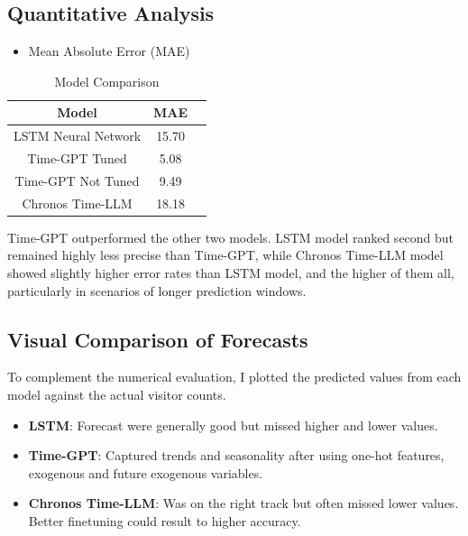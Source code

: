 \documentclass{article}
\begin{document}
\subsection{Quantitative Analysis}
\begin{itemize}
    \item Mean Absolute Error (MAE)
\end{itemize}

\begin{table}[h]
\centering
\begin{tabular}{|c|c|c|}
\hline  
\textbf{Model} & \textbf{MAE} \\
\hline
LSTM Neural Network  & 15.70 \\
\hline
Time-GPT Tuned  & 5.08 \\
\hline
Time-GPT Not Tuned &  9.49 \\
\hline
Chronos Time-LLM  & 18.18 \\
\hline

\end{tabular}
\caption{Model Comparison}
\label{tab:example}
\end{table}

Time-GPT outperformed the other two models. LSTM model ranked second but remained highly less precise than Time-GPT, while Chronos Time-LLM model showed slightly higher error rates than LSTM model, and the higher of them all, particularly in scenarios of longer prediction windows.

\subsection{Visual Comparison of Forecasts}
To complement the numerical evaluation, I plotted the predicted values from each model against the actual visitor counts.

\begin{itemize}
    \item \textbf{LSTM}: Forecast were generally good but missed higher and lower values.
\end{itemize}

\begin{itemize}
    \item \textbf{Time-GPT}: Captured trends and seasonality after using one-hot features, exogenous and future exogenous variables.
\end{itemize}

\begin{itemize}
    \item \textbf{Chronos Time-LLM}: Was on the right track but often missed lower values. Better finetuning could result to higher accuracy.
\end{itemize}
\end{document}

